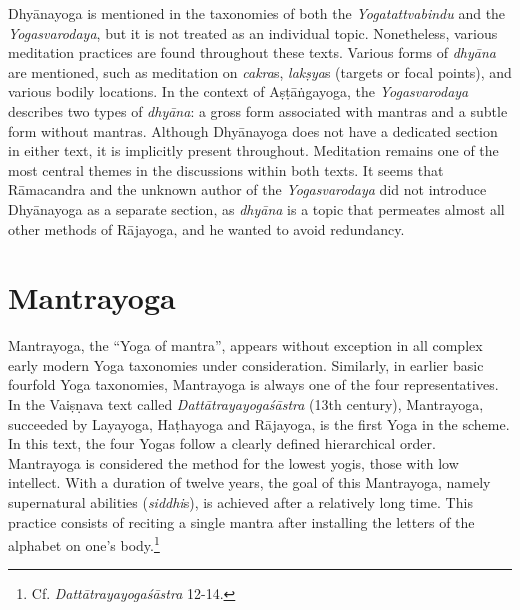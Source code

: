 Dhyānayoga is mentioned in the taxonomies of both the \textit{Yogatattvabindu} and the \textit{Yogasvarodaya}, but it is not treated as an individual topic. Nonetheless, various meditation practices are found throughout these texts. Various forms of \textit{dhyāna} are mentioned, such as meditation on \textit{cakra}s, \textit{lakṣya}s (targets or focal points), and various bodily locations. In the context of Aṣṭāṅgayoga, the \textit{Yogasvarodaya} describes two types of \textit{dhyāna}: a gross form associated with mantras and a subtle form without mantras. Although Dhyānayoga does not have a dedicated section in either text, it is implicitly present throughout. Meditation remains one of the most central themes in the discussions within both texts. It seems that Rāmacandra and the unknown author of the \emph{Yogasvarodaya} did not introduce Dhyānayoga as a separate section, as \textit{dhyāna} is a topic that permeates almost all other methods of Rājayoga, and he wanted to avoid redundancy.  

\section{Mantrayoga}
\label{dhyānayogaintro}
Mantrayoga, the ``Yoga of mantra'', appears without exception in all complex early modern Yoga taxonomies under consideration. Similarly, in earlier basic fourfold Yoga taxonomies, Mantrayoga is always one of the four representatives. In the Vaiṣṇava text called \emph{Dattātrayayogaśāstra} (13th century), Mantrayoga, succeeded by Layayoga, Haṭhayoga and Rājayoga, is the first Yoga in the scheme. In this text, the four Yogas follow a clearly defined hierarchical order. Mantrayoga is considered the method for the lowest yogis, those with low intellect. With a duration of twelve years, the goal of this Mantrayoga, namely supernatural abilities (\textit{siddhi}s), is achieved after a relatively long time. This practice consists of reciting a single mantra after installing the letters of the alphabet on one's body.\footnote{Cf. \emph{Dattātrayayogaśāstra} 12-14.} 

